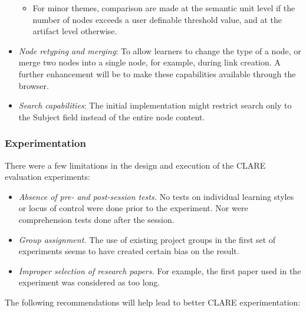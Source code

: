 \begin{itemize}
\begin{itemize}
  \item For minor themes, comparison are made at the semantic unit
    level if the number of nodes exceeds a user definable threshold
    value, and at the artifact level otherwise.
  \end{itemize}

\item {\it Node retyping and merging}: To allow learners to change
  the type of a node, or merge two nodes into a single node, for example,
  during link creation. A further enhancement will be to make these
  capabilities available through the browser. 
  
\item {\it Search capabilities}: The initial implementation might
  restrict search only to the {\sf Subject\/} field instead of the
  entire node content.
\end{itemize}


\subsubsection{Experimentation}

There were a few limitations in the design and execution of the CLARE
evaluation experiments:

\begin{itemize}
\item {\it Absence of pre- and post-session tests.\/} No tests on
  individual learning styles or locus of control were done prior to the
  experiment. Nor were comprehension tests done after the session.
  
\item {\it Group assignment.\/} The use of existing project groups in the
  first set of experiments seems to have created certain bias on the
  result.
  
\item {\it Improper selection of research papers.\/} For example, the
  first paper used in the experiment was considered as too long.
\end{itemize}


The following recommendations will help lead to better CLARE
experimentation:

